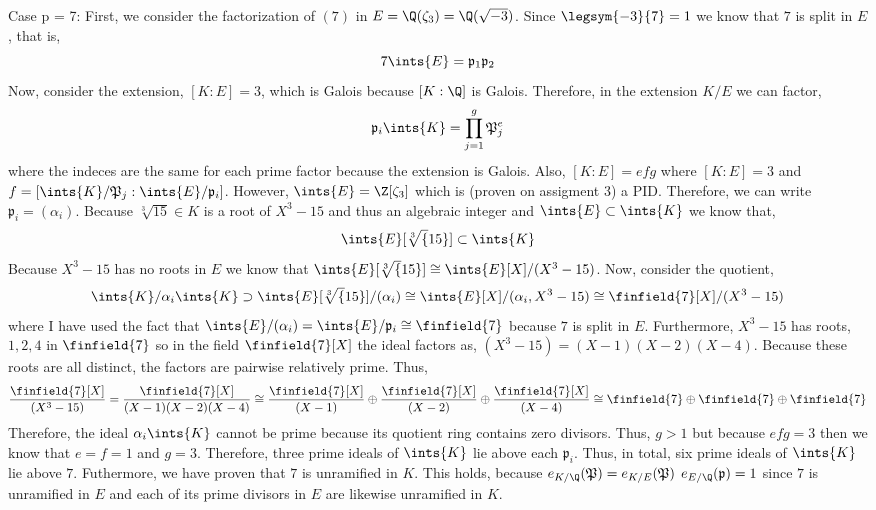 
Case p = 7: First, we consider the factorization of $(7)$ in $E = \Q(\zeta_3) = \Q(\sqrt{-3})$. Since $\legsym{-3}{7} = 1$ we know that $7$ is split in $E$, that is,
\[7 \ints{E} = \mathfrak{p}_1 \mathfrak{p}_2\] 
Now, consider the extension, $[K : E] = 3$, which is Galois because $[K : \Q]$ is Galois. Therefore, in the extension $K/E$ we can factor,
\[ \mathfrak{p}_i \ints{K} = \prod_{j = 1}^g \mathfrak{P}_j^{e}\]
where the indeces are the same for each prime factor because the extension is Galois. Also, $[K : E] = efg$ where $[K : E] = 3$ and $f = [\ints{K}/\mathfrak{P}_j : \ints{E}/\mathfrak{p}_i]$. However, $\ints{E} = \Z[\zeta_3]$ which is (proven on assigment 3) a PID. Therefore, we can write $\mathfrak{p}_i = (\alpha_i)$. Because $\sqrt[3]{15} \in K$ is a root of $X^3 - 15$ and thus an algebraic integer and $\ints{E} \subset \ints{K}$ we know that, \[\ints{E}[\sqrt[3]{15}] \subset \ints{K}\] Because $X^3 - 15$ has no roots in $E$ we know that $\ints{E}[\sqrt[3]{15}] \cong \ints{E}[X]/(X^3 - 15)$. Now, consider the quotient,
\[ \ints{K}/ \alpha_i \ints{K} \supset \ints{E}[\sqrt[3]{15}]/(\alpha_i) \cong \ints{E}[X]/(\alpha_i, X^3 - 15) \cong \finfield{7}[X]/(X^3 - 15) \]
where I have used the fact that $\ints{E}/(\alpha_i) = \ints{E}/\mathfrak{p}_i \cong \finfield{7}$ because $7$ is split in $E$. Furthermore, $X^3 - 15$ has roots, $1, 2, 4$ in $\finfield{7}$ so in the field $\finfield{7}[X]$ the ideal factors as, $(X^3 - 15) = (X - 1)(X - 2)(X - 4)$. Because these roots are all distinct, the factors are pairwise relatively prime. Thus,
\[\frac{\finfield{7}[X]}{(X^3 - 15)} = \frac{\finfield{7}[X]}{(X - 1)(X - 2)(X - 4)} \cong \frac{\finfield{7}[X]}{(X - 1)} \oplus \frac{\finfield{7}[X]}{(X - 2)}  \oplus \frac{\finfield{7}[X]}{(X - 4)}  \cong \finfield{7} \oplus \finfield{7} \oplus \finfield{7}\] 
Therefore, the ideal $\alpha_i \ints{K}$ cannot be prime because its quotient ring contains zero divisors. Thus, $g > 1$ but because $efg = 3$ then we know that $e = f = 1$ and $g = 3$. Therefore, three prime ideals of $\ints{K}$ lie above each $\mathfrak{p}_i$. Thus, in total, six prime ideals of $\ints{K}$ lie above $7$. Futhermore, we have proven that $7$ is unramified in $K$. This holds, because $e_{K/\Q}(\mathfrak{P}) = e_{K/E}(\mathfrak{P}) \: \: e_{E/\Q}(\mathfrak{p}) = 1$ since $7$ is unramified in $E$ and each of its prime divisors in $E$ are likewise unramified in $K$. 